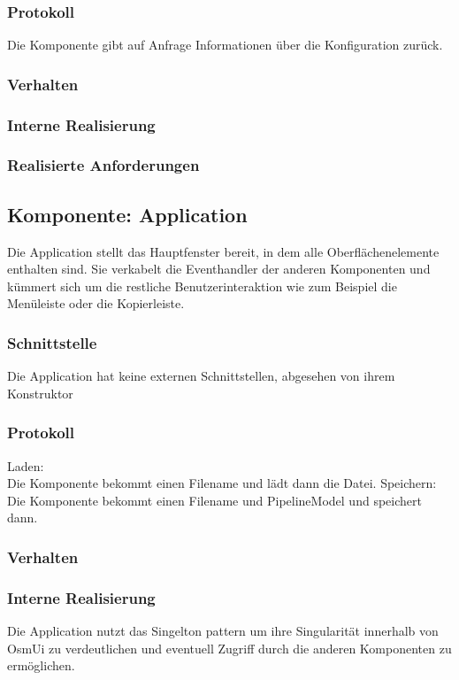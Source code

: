 \documentclass[a4paper,12pt]{scrartcl}
\begin{document}
\subsubsection{Protokoll}
Die Komponente gibt auf Anfrage Informationen über die Konfiguration zurück.
\subsubsection{Verhalten}
\subsubsection{Interne Realisierung}
\subsubsection{Realisierte Anforderungen}


\subsection{Komponente: Application}
Die Application stellt das Hauptfenster bereit, in dem alle Oberflächenelemente enthalten sind.
Sie verkabelt die Eventhandler der anderen Komponenten und kümmert sich um die restliche Benutzerinteraktion wie zum Beispiel die Menüleiste oder die Kopierleiste.
\subsubsection{Schnittstelle}
Die Application hat keine externen Schnittstellen, abgesehen von ihrem Konstruktor
\subsubsection{Protokoll}
Laden: \\
Die Komponente bekommt einen Filename und lädt dann die Datei.
Speichern: \\
Die Komponente bekommt einen Filename und PipelineModel und speichert dann.
\subsubsection{Verhalten}
\subsubsection{Interne Realisierung}
Die Application nutzt das Singelton pattern um ihre Singularität innerhalb von OsmUi zu verdeutlichen und eventuell Zugriff durch die anderen Komponenten zu ermöglichen.
\end{document}
